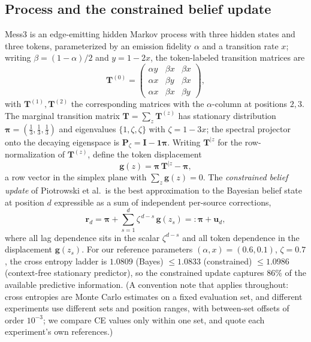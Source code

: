 \documentclass{article}
\newcommand{\gb}{\boldsymbol{g}}
\newcommand{\ub}{\boldsymbol{u}}
\newcommand{\rb}{\boldsymbol{r}}
\newcommand{\Ib}{\boldsymbol{I}}
\newcommand{\Pb}{\boldsymbol{P}}
\newcommand{\Tb}{\boldsymbol{T}}
\newcommand{\pib}{\boldsymbol{\pi}}
\newcommand{\one}{\boldsymbol{1}}
\newcommand{\Tz}[1]{\Tb^{(#1)}}
\newcommand{\Tcond}[1]{\Tb^{|#1}}
\theoremstyle{definition}
\begin{document}
\subsection{Process and the constrained belief update}

Mess3 is an edge-emitting hidden Markov process with three hidden states and
three tokens, parameterized by an emission fidelity $\alpha$ and a transition
rate $x$; writing $\beta = (1-\alpha)/2$ and $y = 1-2x$, the token-labeled
transition matrices are
\begin{equation}
\Tz{0} =
\begin{pmatrix}
\alpha y & \beta x & \beta x \\
\alpha x & \beta y & \beta x \\
\alpha x & \beta x & \beta y
\end{pmatrix},
\end{equation}
with $\Tz{1}, \Tz{2}$ the corresponding matrices with the $\alpha$-column at
positions $2, 3$. The marginal transition matrix $\Tb = \sum_z \Tz{z}$ has
stationary distribution $\pib = (\tfrac13,\tfrac13,\tfrac13)$ and eigenvalues
$\{1, \zeta, \zeta\}$ with $\zeta = 1-3x$; the spectral projector onto the
decaying eigenspace is $\Pb_\zeta = \Ib - \one\pib$. Writing
$\Tcond{z}$ for the row-normalization of $\Tz{z}$, define the token
displacement
\begin{equation}\label{gdef}
\gb(z) = \pib\, \Tcond{z} - \pib,
\end{equation}
a row vector in the simplex plane with $\sum_z \gb(z) = 0$. The
\textit{constrained belief update} of Piotrowski et al.\ is the best
approximation to the Bayesian belief state at position $d$ expressible as a
sum of independent per-source corrections,
\begin{equation}\label{constrained}
\rb_d = \pib + \sum_{s=1}^{d} \zeta^{\,d-s}\, \gb(z_s)
=: \pib + \ub_d,
\end{equation}
where all lag dependence sits in the scalar $\zeta^{d-s}$ and all token
dependence in the displacement $\gb(z_s)$. For our reference parameters
$(\alpha, x) = (0.6, 0.1)$, $\zeta = 0.7$, the cross entropy ladder is
$1.0809$ (Bayes) $\le 1.0833$ (constrained) $\le 1.0986$ (context-free
stationary predictor), so the constrained update captures $86\%$ of the
available predictive information. (A convention note that applies
throughout: cross entropies are Monte Carlo estimates on a fixed evaluation
set, and different experiments use different sets and position ranges, with
between-set offsets of order $10^{-3}$; we compare CE values only within
one set, and quote each experiment's own references.)
\end{document}
